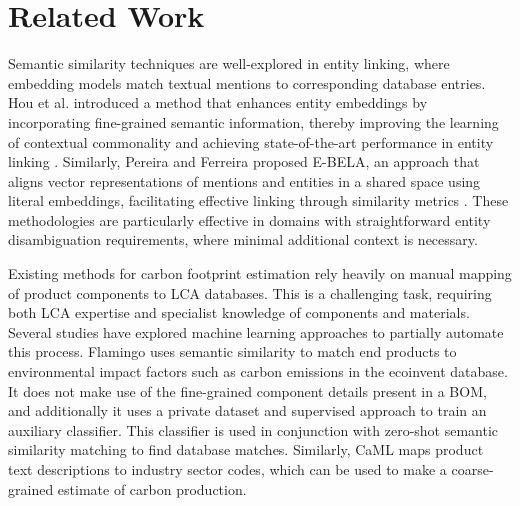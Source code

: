 \section{Related Work}
Semantic similarity techniques are well-explored in entity linking, where embedding models match textual mentions to corresponding database entries. Hou et al. introduced a method that enhances entity embeddings by incorporating fine-grained semantic information, thereby improving the learning of contextual commonality and achieving state-of-the-art performance in entity linking \cite{hou2020improving}. Similarly, Pereira and Ferreira proposed E-BELA, an approach that aligns vector representations of mentions and entities in a shared space using literal embeddings, facilitating effective linking through similarity metrics \cite{pereira2024ebela}. These methodologies are particularly effective in domains with straightforward entity disambiguation requirements, where minimal additional context is necessary. 

Existing methods for carbon footprint estimation rely heavily on manual mapping of product components to LCA databases. This is a challenging task, requiring both LCA expertise and specialist knowledge of components and materials. Several studies have explored machine learning approaches to partially automate this process. Flamingo \cite{balaji2023flamingo} uses semantic similarity to match end products to environmental impact factors such as carbon emissions in the ecoinvent database. It does not make use of the fine-grained component details present in a BOM, and additionally it uses a private dataset and supervised approach to train an auxiliary classifier. This classifier is used in conjunction with zero-shot semantic similarity matching to find database matches. Similarly, CaML \cite{balaji2023caml} maps product text descriptions to industry sector codes, which can be used to make a coarse-grained estimate of carbon production.